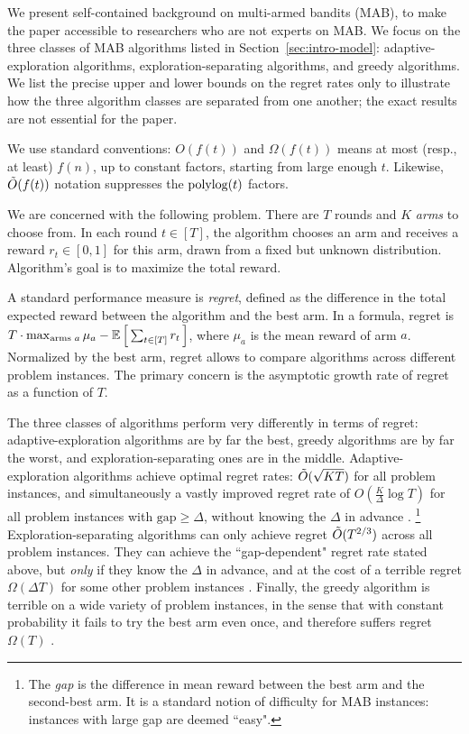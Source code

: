 We present self-contained background on multi-armed bandits (MAB), to make the paper accessible to researchers who are not experts on MAB. 
We focus on the three classes of MAB algorithms listed in Section~\ref{sec:intro-model}: adaptive-exploration algorithms, exploration-separating algorithms, and greedy algorithms. We list the precise upper and lower bounds on the regret rates only to illustrate how the three algorithm classes are separated from one another; the exact results are not essential for the paper. 

We use standard conventions: $O(f(t))$ and $\Omega(f(t))$ means at most (resp., at least) $f(n)$, up to constant factors, starting from large enough $t$. Likewise, $\tilde{O}(f(t))$ notation suppresses the $\polylog(t)$ factors.

We are concerned with the following problem. There are $T$ rounds and $K$ \emph{arms} to choose from. In each round $t\in [T]$, the algorithm chooses an arm and receives a reward $r_t\in[0,1]$ for this arm, drawn from a fixed but unknown distribution. Algorithm's goal is to maximize the total reward.

A standard performance measure is \emph{regret}, defined as the difference in the total expected reward between the algorithm and the best arm. In a formula, regret is
    $T\cdot \max_{\text{arms $a$}}\mu_a
    -  \E\sbr{ \sum_{t\in[T]} r_t }$,
where $\mu_a$ is the mean reward of arm $a$.
Normalized by the best arm, regret allows to compare algorithms across different problem instances.
The primary concern is the asymptotic growth rate of regret as a function of $T$.

The three classes of algorithms perform very differently in terms of regret: adaptive-exploration algorithms are by far the best, greedy algorithms are by far the worst, and exploration-separating ones are in the middle. Adaptive-exploration algorithms achieve optimal regret rates:
    $\tilde{O}(\sqrt{KT})$
for all problem instances, and simultaneously a vastly improved regret rate of
    $O(\tfrac{K}{\Delta}\log T)$
for all problem instances with $\text{gap}\geq \Delta$, without knowing the $\Delta$ in advance
\citep{Lai-Robbins-85,bandits-ucb1,bandits-exp3}.%
\footnote{The \emph{gap} is the difference in mean reward between the best arm and the second-best arm. It is a standard notion of difficulty for MAB instances: instances with large gap are deemed  ``easy".}
Exploration-separating algorithms can only achieve regret $\tilde{O}(T^{2/3})$ across all problem instances. They can achieve the ``gap-dependent" regret rate stated above, but \emph{only} if they know the $\Delta$ in advance, and at the cost of a terrible regret $\Omega(\Delta T)$ for some other problem instances \citep{MechMAB-ec09}. Finally, the greedy algorithm is terrible on a wide variety of problem instances, in the sense that with constant probability it fails to try the best arm even once, and therefore suffers regret $\Omega(T)$
\citep[see Chapter 11.2 in][]{slivkins-MABbook}.


